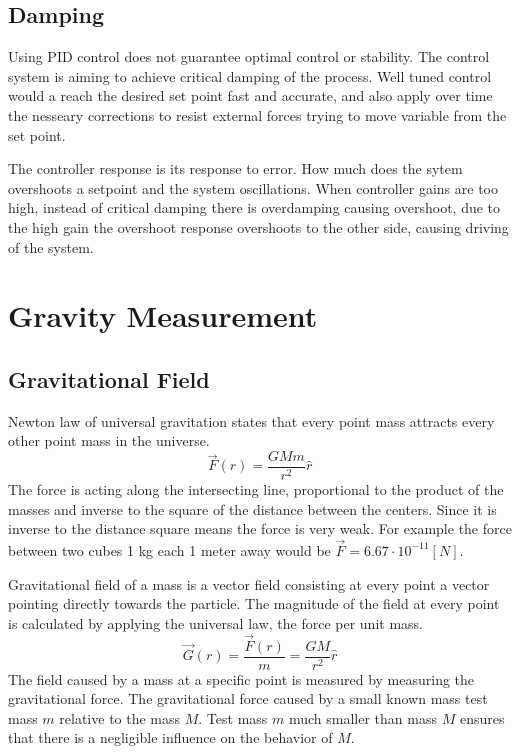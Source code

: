 \documentclass[\main/master.tex]{subfiles}
\begin{document}
\subsection{Damping}
Using PID control does not guarantee optimal control or stability. The control system is aiming to achieve critical damping of the process. Well tuned control would a reach the desired set point fast and accurate, and also apply over time the nesseary corrections to resist external forces trying to move variable from the set point.
\par
The controller response is its response to error. How much does the sytem overshoots a setpoint and the system oscillations. When controller gains are too high, instead of critical damping there is overdamping causing overshoot, due to the high gain the overshoot response overshoots to the other side, causing driving of the system.





\section{Gravity Measurement}

\subsection{Gravitational Field}
Newton law of universal gravitation states that every point mass attracts every other point mass in the universe.
\begin{equation}
\overrightarrow{F}(r) = \frac{GMm}{r^2}\hat{r}    \label{eqn:gravitation_force}
\end{equation} 
The force is acting along the intersecting line, proportional to the product of the masses and inverse to the square of the distance between the centers. Since it is inverse to the distance square means the force is very weak. For example the force between two cubes 1 kg each 1 meter away would be $\overrightarrow{F} = 6.67\cdot10^{-11} [N]$.
\par
Gravitational field of a mass is a vector field consisting at every point a vector pointing directly towards the particle. The magnitude of the field at every point is calculated by applying the universal law, the force per unit mass. 
\begin{equation}
\overrightarrow{G}(r) = \frac{\overrightarrow{F}(r)}{m} = \frac{GM}{r^2}\hat{r}    \label{eqn:gravitation_field}
\end{equation}
The field caused by a mass at a specific point is measured by measuring the gravitational force. The gravitational force caused by a small known mass test mass $m$ relative to the mass $M$. Test mass $m$ much smaller than mass $M$ ensures that there is a negligible influence on the behavior of $M$.  
\end{document}

